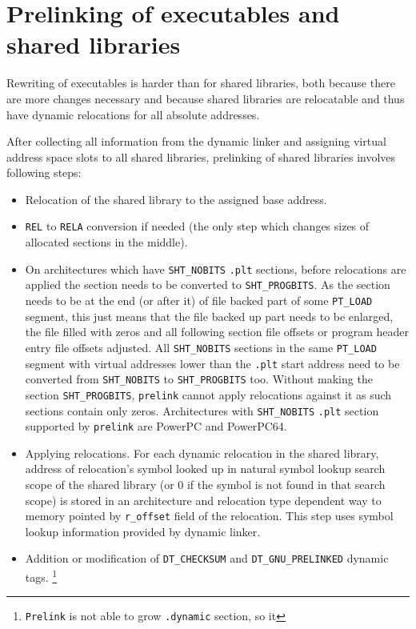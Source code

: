 \documentclass[twoside]{article}
\def\tts#1{\texttt{\small #1}}
\begin{document}
\section{Prelinking of executables and shared libraries}

Rewriting of executables is harder than for shared libraries, both because
there are more changes necessary and because shared libraries are
relocatable and thus have dynamic relocations for all absolute addresses.

After collecting all information from the dynamic linker and assigning
virtual address space slots to all shared libraries, prelinking of shared
libraries involves following steps:
\begin{itemize}
\item Relocation of the shared library to the assigned base address.
\item \tts{REL} to \tts{RELA} conversion if needed (the only step which
changes sizes of allocated sections in the middle).
\item On architectures which have \tts{SHT\_NOBITS} \tts{.plt} sections,
before relocations are applied the section needs to be converted to
\tts{SHT\_PROGBITS}.  As the section needs to be at the end (or after it)
of file backed part of some \tts{PT\_LOAD} segment, this just means that
the file backed up part needs to be enlarged, the file filled with zeros
and all following section file offsets or program header entry file
offsets adjusted.  All \tts{SHT\_NOBITS} sections in the same \tts{PT\_LOAD}
segment with virtual addresses lower than the \tts{.plt} start address
need to be converted from \tts{SHT\_NOBITS} to \tts{SHT\_PROGBITS} too.
Without making the section \tts{SHT\_PROGBITS}, \tts{prelink} cannot
apply relocations against it as such sections contain only zeros.
Architectures with \tts{SHT\_NOBITS} \tts{.plt} section supported by
\tts{prelink} are PowerPC and PowerPC64.
\item Applying relocations.  For each dynamic relocation in the shared
library, address of relocation's symbol looked up in natural symbol lookup
search scope of the shared library (or 0 if the symbol is not found in
that search scope) is stored in an architecture and relocation type
dependent way to memory pointed by \tts{r\_offset} field of the relocation.
This step uses symbol lookup information provided by dynamic linker.
\item Addition or modification of \tts{DT\_CHECKSUM} and
\tts{DT\_GNU\_PRELINKED} dynamic tags.
\footnote{\tts{Prelink} is not able to grow \tts{.dynamic} section, so it
}
\end{itemize}
\end{document}
